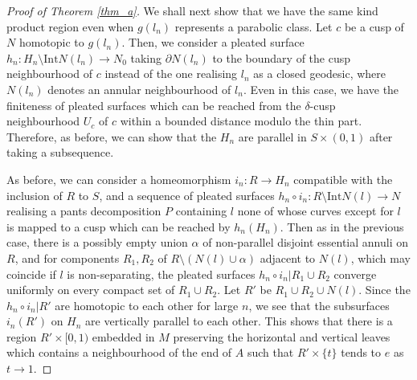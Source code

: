 \documentclass{amsart}
\theoremstyle{definition}
\numberwithin{figure}{section}
\numberwithin{equation}{section}
\def\Int{\mathrm{Int}}
\begin{document}
\begin{proof}[Proof of Theorem \ref{thm_a}]
We shall next show that we have the same kind product region even when $g(l_n)$ represents a parabolic class.
Let $c$ be a cusp of $N$ homotopic to $g(l_n)$.
Then, we consider a pleated surface $h_n: H_n \setminus \Int N( l_n) \rightarrow N_0$ taking $\partial N(l_n)$ to the boundary of the cusp neighbourhood  of $c$ instead of the one realising $l_n$ as a closed geodesic, where $N(l_n)$ denotes an annular neighbourhood of $l_n$.
Even in this case, we have the finiteness of pleated surfaces which can be reached from the $\delta$-cusp neighbourhood $U_c$ of $c$ within a bounded distance modulo the thin part.
Therefore, as before, we can show that the $H_n$ are parallel in $S \times (0,1)$ after taking a subsequence.

As before, we can consider a homeomorphism $i_n : R \rightarrow H_n$ compatible with the inclusion of $R$ to $S$, and a sequence of pleated surfaces $h_n \circ i_n: R\setminus \Int N(l) \rightarrow N$ realising a pants decomposition $P$ containing $l$ none of whose curves except for $l$ is mapped to a cusp which can be reached by $h_n(H_n)$.
Then as in the previous case, there is a possibly empty union $\alpha$ of non-parallel disjoint essential annuli on $R$, and for components $R_1, R_2$ of $R \setminus (N(l) \cup \alpha)$ adjacent to $N(l)$, which may coincide if $l$ is non-separating, the pleated surfaces $h_n \circ i_n|R_1 \cup R_2$ converge uniformly on every compact set of $R_1 \cup R_2$.
Let $R'$ be $R_1 \cup R_2 \cup N(l)$.
Since the $h_n \circ i_n|R'$ are homotopic to each other for large $n$, we see that the subsurfaces $i_n(R')$ on $H_n$ are vertically parallel to each other.
This shows that there is a region $R' \times [0,1)$ embedded in $M$ preserving the horizontal and vertical leaves which contains a neighbourhood of the end of $A$ such that $R' \times \{t\}$ tends to $e$ as $t \rightarrow 1$.



\end{proof}
\end{document}
